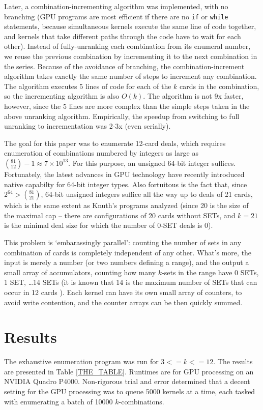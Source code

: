 \documentclass[10pt]{amsart}
\begin{document}
Later, a combination-incrementing algorithm was implemented, with no branching
(GPU programs are most efficient if there are no {\tt if} or {\tt while}
statements, because simultaneous kernels execute the same line of code together,
and kernels that take different paths through the code have to wait for each
other). Instead of fully-unranking each combination from its enumeral number, we
reuse the previous combination by incrementing it to the next combination in the
series. Because of the avoidance of branching, the combination-increment
algorithm takes exactly the same number of steps to increment any
combination. The algorithm executes 5 lines of code for each of the $k$ cards in
the combination, so the incrementing algorithm is also $O(k)$. The algorithm is
not 9x faster, however, since the 5 lines are more complex than the simple steps
taken in the above unranking algorithm. Empirically, the speedup from switching
to full unranking to incrementation was 2-3x (even serially).

The goal for this paper was to enumerate 12-card deals, which requires
enumeration of combinations numbered by integers as large as $\binom{81}{12}-1
\approx 7\times 10^{13}$. For this purpose, an unsigned 64-bit integer
suffices. Fortunately, the latest advances in GPU technology have recently
introduced native capabilty for 64-bit integer types. Also fortuitous is the
fact that, since $2^{64} > \binom{81}{21}$, 64-bit unsigned integers suffice all
the way up to deals of 21 cards, which is the same extent as Knuth's programs
analyzed (since 20 is the size of the maximal cap -- there are configurations of
20 cards without SETs, and $k=21$ is the minimal deal size for which the number
of 0-SET deals is 0).

This problem is `embarassingly parallel': counting the number of sets in any
combination of cards is completely independent of any other. What's more, the
input is merely a number (or two numbers defining a range), and the output a
small array of accumulators, counting how many $k$-sets in the range have 0
SETs, 1 SET, \ldots 14 SETs (it is known that 14 is the maximum number of SETs
that can occur in 12 cards \cite{VINCI}). Each kernel can have its own small
array of counters, to avoid write contention, and the counter arrays can be then
quickly summed.

\section{Results}
The exhaustive enumeration program was run for $3<=k<=12$. The results are
presented in Table \ref{THE_TABLE}. Runtimes are for GPU processing on an
NVIDIA Quadro P4000. Non-rigorous trial and error determined that a decent
setting for the GPU processing was to queue 5000 kernels at a time, each tasked
with enumerating a batch of 10000 $k$-combinations.
\end{document}
